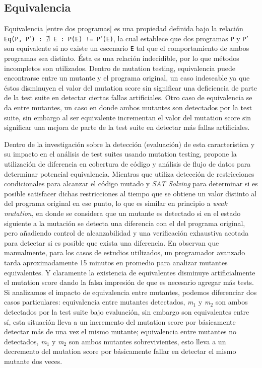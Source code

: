 \subsection{Equivalencia}

Equivalencia [entre dos programas] es una propiedad definida bajo la relaci\'on \texttt{Eq(P, P$\prime$) : $\nexists$ E : P(E) != P$\prime$(E)}, la cual establece que dos programas \texttt{P} y \texttt{P$\prime$} son equivalente si no existe un escenario \texttt{E} tal que el comportamiento de ambos programas sea distinto. \'Esta es una relaci\'on indecidible, por lo que m\'etodos incompletos son utilizados. Dentro de mutation testing, equivalencia puede encontrarse entre un mutante y el programa original, un caso indeseable ya que \'estos disminuyen el valor del mutation score sin significar una deficiencia de parte de la test suite en detectar ciertas fallas artificiales. Otro caso de equivalencia se da entre mutantes, un caso en donde ambos mutantes son detectados por la test suite, sin embargo al ser equivalente incrementan el valor del mutation score sin significar una mejora de parte de la test suite en detectar m\'as fallas artificiales.

Dentro de la investigaci\'on sobre la detecci\'on (evaluaci\'on) de esta caracter\'istica y su impacto en el an\'alisis de test suites usando mutation testing, \cite{biblography.mutation.evaluation.equivalent.Schuler+10} propone la utilizaci\'on de diferencia en cobertura de c\'odigo y an\'alisis de flujo de datos para determinar potencial equivalencia. Mientras que  \cite{biblography.mutation.evaluation.equivalent.Just+13} utiliza detecci\'on de restricciones condicionales para alcanzar el c\'odigo mutado y \emph{SAT Solving} para determinar si es posible satisfacer dichas restricciones al tiempo que se obtiene un valor distinto al del programa original en ese punto, lo que es similar en principio a \emph{weak mutation}, en donde se considera que un mutante es detectado si en el estado siguiente a la mutaci\'on se detecta una diferencia con el del programa original, pero a\~nadiendo control de alcanzabilidad y una verificaci\'on exhaustiva acotada para detectar si es posible que exista una diferencia.
En \cite{biblography.mutation.evaluation.equivalent.Grun+09} observan que manualmente, para los casos de estudios utilizados, un programador avanzado tarda aproximadamente 15 minutos en promedio para analizar mutantes equivalentes. Y claramente la existencia de equivalentes disminuye artificialmente el mutation score dando la falsa impresi\'on de que es necesario agregar m\'as tests. Si analizamos el impacto de equivalencia entre mutantes, podemos diferenciar dos casos particulares: equivalencia entre mutantes detectados, \emph{m$_1$} y \emph{m$_2$} son ambos detectados por la test suite bajo evaluaci\'on, sin embargo son equivalentes entre s\'i, esta situaci\'on lleva a un incremento del mutation score por b\'asicamente detectar m\'as de una vez el mismo mutante; equivalencia entre mutantes no detectados, \emph{m$_1$} y \emph{m$_2$} son ambos mutantes sobrevivientes, esto lleva a un decremento del mutation score por b\'asicamente fallar en detectar el mismo mutante dos veces.

